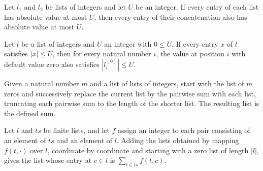 \begin{theorem}
\label{Light.AbsLe.append}
\leanok
{}
Let $l_1$ and $l_2$ be lists of integers and let $U$ be an integer. If every entry of
each list has absolute value at most $U$, then every entry of their concatenation also
has absolute value at most $U$.
\end{theorem}

\begin{theorem}
\label{Light.AbsLe.abs_getD_le}
\leanok
{}
Let $l$ be a list of integers and $U$ an integer with $0\le U$. If every entry $x$ of
$l$ satisfies $|x|\le U$, then for every natural number $i$, the value at position $i$
with default value zero also satisfies $|l_i^{(0)}|\le U$.
\end{theorem}

\begin{definition}
\label{Light.sumLists}
\leanok
Given a natural number $m$ and a list of lists of integers, start with the list of $m$
zeros and successively replace the current list by the pairwise sum with each list,
truncating each pairwise sum to the length of the shorter list. The resulting list is
the defined sum.
\end{definition}

\begin{theorem}
\label{Light.sumLists_map}
\leanok
{}
Let $l$ and $ts$ be finite lists, and let $f$ assign an integer to each pair consisting
of an element of $ts$ and an element of $l$. Adding the lists obtained by mapping
$f(t,\cdot)$ over $l$, coordinate by coordinate and starting with a zero list of length
$|l|$, gives the list whose entry at $c\in l$ is $\sum_{t\in ts} f(t,c)$.
\end{theorem}
